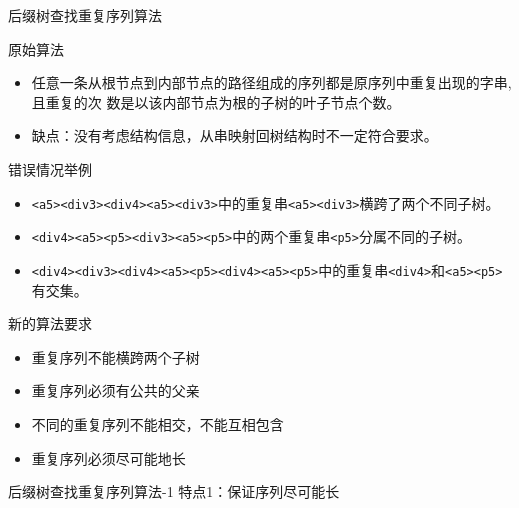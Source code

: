 \begin{frame}[label=sec-2-8]{后缀树查找重复序列算法}
\begin{block}{原始算法}
\begin{itemize}
\item 任意一条从根节点到内部节点的路径组成的序列都是原序列中重复出现的字串,且重复的次
数是以该内部节点为根的子树的叶子节点个数。
\item 缺点：没有考虑结构信息，从串映射回树结构时不一定符合要求。
\end{itemize}
\end{block}
\pause
\begin{block}{错误情况举例}
  \begin{itemize}[<+->]
\item \texttt{<a5><div3><div4><a5><div3>}中的重复串\texttt{<a5><div3>}横跨了两个不同子树。
\item \texttt{<div4><a5><p5><div3><a5><p5>}中的两个重复串\texttt{<p5>}分属不同的子树。
\item \texttt{<div4><div3><div4><a5><p5><div4><a5><p5>}中的重复串\texttt{<div4>}和\texttt{<a5><p5>}有交集\texttt{}。
  \end{itemize}
\end{block}
\end{frame}
\begin{frame} {新的算法要求}
\begin{itemize}
\item 重复序列不能横跨两个子树
\item 重复序列必须有公共的父亲
\item 不同的重复序列不能相交，不能互相包含
\item 重复序列必须尽可能地长
\end{itemize}
\end{frame}

\begin{frame}{后缀树查找重复序列算法-1}
  特点1：\alert{保证序列尽可能长}
\end{frame}

